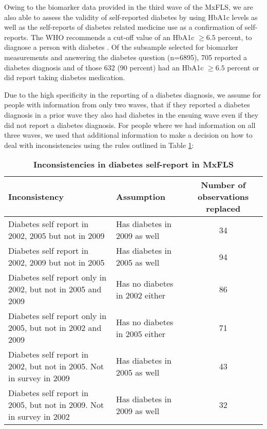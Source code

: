 Owing to the biomarker data provided in the third wave of the \ac{MxFLS},
we are also able to assess the validity of self-reported diabetes
by using \ac{HbA1c} levels as well as the self-reports of diabetes
related medicine use as a confirmation of self-reports. The \ac{WHO}
recommends a cut-off value of an \ac{HbA1c} $\geq6.5$ percent,
to diagnose a person with diabetes \citep{WorldHealthOrganization2011}.
Of the subsample selected for biomarker measurements and answering
the diabetes question (n=6895), 705 reported a diabetes diagnosis
and of those 632 (90 percent) had an \ac{HbA1c} $\geq6.5$ percent
or did report taking diabetes medication.

Due to the high specificity in the reporting of a diabetes diagnosis,
we assume for people with information from only two waves, that if
they reported a diabetes diagnosis in a prior wave they also had diabetes
in the ensuing wave even if they did not report a diabetes diagnosis.
For people where we had information on all three waves, we used that
additional information to make a decision on how to deal with inconsistencies
using the rules outlined in Table \ref{tab:Inconsistencies}:

\begin{table}[h!]

\begin{centering}
\begin{tabular}{llc}
Inconsistency  & Assumption  & Number of observations replaced\tabularnewline
\hline 
Diabetes self report in 2002, 2005 but not in 2009  & Has diabetes in 2009 as well  & 34\tabularnewline
Diabetes self report in 2002, 2009 but not in 2005  & Has diabetes in 2005 as well  & 94\tabularnewline
Diabetes self report only in 2002, but not in 2005 and 2009  & Has no diabetes in 2002 either  & 86\tabularnewline
Diabetes self report only in 2005, but not in 2002 and 2009  & Has no diabetes in 2005 either  & 71\tabularnewline
Diabetes self report in 2002, but not in 2005. Not in survey in 2009  & Has diabetes in 2005 as well  & 43\tabularnewline
Diabetes self report in 2005, but not in 2009. Not in survey in 2002  & Has diabetes in 2009 as well  & 32\tabularnewline
\hline 
\end{tabular}%
\par\end{centering}

\caption{\label{tab:Inconsistencies}\textbf{Inconsistencies in diabetes self-report
in MxFLS}}
\end{table}


